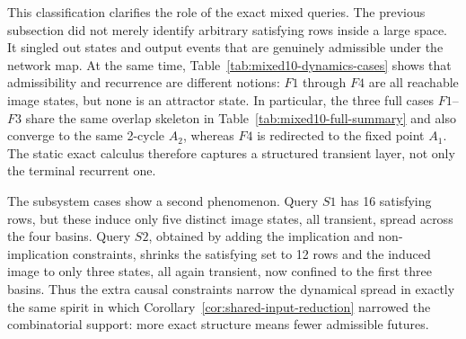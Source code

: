 \documentclass[11pt]{article}
\theoremstyle{definition}
\begin{document}
This classification clarifies the role of the exact mixed queries. The previous subsection did not merely
identify arbitrary satisfying rows inside a large space. It singled out states and output events that are
genuinely admissible under the network map. At the same time, Table~\ref{tab:mixed10-dynamics-cases}
shows that admissibility and recurrence are different notions: \(F1\) through \(F4\) are all reachable
image states, but none is an attractor state. In particular, the three full cases \(F1\)--\(F3\) share the
same overlap skeleton in Table~\ref{tab:mixed10-full-summary} and also converge to the same 2-cycle
\(A_2\), whereas \(F4\) is redirected to the fixed point \(A_1\). The static exact calculus therefore
captures a structured transient layer, not only the terminal recurrent one.

The subsystem cases show a second phenomenon. Query \(S1\) has 16 satisfying rows, but these induce
only five distinct image states, all transient, spread across the four basins. Query \(S2\), obtained by
adding the implication and non-implication constraints, shrinks the satisfying set to 12 rows and the
induced image to only three states, all again transient, now confined to the first three basins.
Thus the extra causal constraints narrow the dynamical spread in exactly the same spirit in which
Corollary~\ref{cor:shared-input-reduction} narrowed the combinatorial support: more exact structure
means fewer admissible futures.
\end{document}
